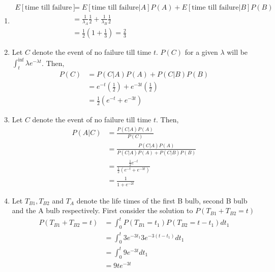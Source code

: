 \documentclass[../../probability-notes.tex]{subfile}
\begin{document}
        \begin{enumerate}
            \item 
            \begin{align*}
                E[\text{time till failure}] &= E[\text{time till failure}|A]P(A) + E[\text{time till failure}|B]P(B)\\
                &= \frac{1}{\lambda_{A}} \frac{1}{2} + \frac{1}{\lambda_{B}} \frac{1}{2}\\
                &= \frac{1}{2}(1 + \frac{1}{3}) = \frac{2}{3}
            \end{align*}

            \item Let $C$ denote the event of no failure till time $t$. $P(C)$ for a given $\lambda$ will be $\int_{t}^{\inf} \lambda e^{-\lambda t}$. Then,
            \begin{align*}
                P(C) &= P(C|A)P(A) + P(C|B)P(B) \tag*{Using total probability theorem}\\
                     &= e^{-t}(\frac{1}{2}) + e^{-3t}(\frac{1}{2})\\
                     &= \frac{1}{2}(e^{-t} + e^{-3t})
            \end{align*}

            \item \label{itm:a_poissonbulb2_c} Let $C$ denote the event of no failure till time $t$. Then,
            \begin{align*}
                P(A|C) &= \frac{P(C|A)P(A)}{P(C)}\\
                       &= \frac{P(C|A)P(A)}{P(C|A)P(A) + P(C|B)P(B)}\\
                       &= \frac{\frac{1}{2} e^{-t}}{\frac{1}{2}(e^{-t} + e^{-3t})}\\
                       &= \frac{1}{1 + e^{-2t}}
            \end{align*}

            \item Let $T_{B1}, T_{B2}$ and $T_{A}$ denote the life times of the first B bulb, second B bulb and the A bulb respectively. First consider the solution to $P(T_{B1} + T_{B2} = t)$
            \begin{align*}
                P(T_{B1} + T_{B2} = t) &= \int_{0}^{t} P(T_{B1} = t_{1})P(T_{B2} = t - t_{1}) dt_{1} \tag*{Using independence}\\
                &= \int_{0}^{t} 3e^{-3t_{1}} 3e^{-3(t - t_{1})} dt_{1}\\
                &= \int_{0}^{t} 9e^{-3t}dt_{1}\\
                &= 9te^{-3t}
            \end{align*}
            

\end{enumerate}
\end{document}
